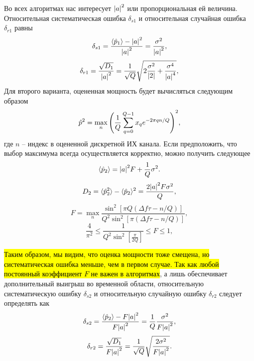 Во всех алгоритмах нас интересует $\abs{a}^2$ или пропорциональная ей величина.
Относительная систематическая ошибка $\delta_{s1}$ и относительная случайная ошибка $\delta_{r1}$ равны
\begin{equation}
    \delta_{s1} = \frac{\langle \hat p_1 \rangle - \abs{a}^2}{\abs{a}^2} = \frac{\sigma^2}{\abs{a}^2},
\end{equation}
\begin{equation}
    \delta_{r1} = \frac{\sqrt{D_1}}{\abs{a}^2} =
    \frac{1}{\sqrt{Q}} \sqrt{2 \frac{\sigma^2}{\abs{2}} +
        \frac{\sigma^4}{\abs{a}^4}},
\end{equation}
Для второго варианта, оцененная мощность будет вычисляться следующим образом
\begin{equation}
    \hat p^2 = \max_n\qty(\frac{1}{Q} \sum\limits_{q=0}^{Q-1} x_q e^{-2 \pi q n /Q})^2,
\end{equation}
где $n$ -- индекс в оцененной дискретной ИХ канала. 
Если предположить, что выбор максимума всегда осуществляется корректно, можно
получить следующее
\begin{equation}
    \langle \hat p_2 \rangle = \abs{a}^2 F + \frac{1}{Q}\sigma^2.
\end{equation}
\begin{equation}
    D_2 = \langle \hat p_2^2 \rangle - \langle \hat p_2 \rangle^2 = \frac{2\abs{a}^2 F \sigma^2}{Q},
\end{equation}
\begin{equation}
    F = \max_n \frac{\sin^2[\pi Q (\Delta f \tau - n/Q)]}{Q^2 \sin^2[\pi(\Delta f \tau - n/Q)]},
\end{equation}
\begin{equation}
    \frac{4}{\pi^2} \leq \frac{1}{Q^2 \sin^2[\frac{\pi}{2Q}]} \leq F \leq 1,
\end{equation}


\hl{
Таким образом, мы видим, что оценка мощности тоже смещена, но систематическая
ошибка меньше, чем в первом случае.
Так как любой постоянный коэффициент $F$ не важен в алгоритмах}, а
лишь обеспечивает дополнительный выигрыш во временной области, относительную
систематическую ошибку $\delta_{s2}$ и относительную случайную ошибку $\delta_{r2}$ следует
определять как
\begin{equation}
    \delta_{s2} = \frac{\langle \hat p_2 \rangle - F \abs{a}^2}{F \abs{a}^2} = \frac{1}{Q} \frac{\sigma^2}{F\abs{a}^2},
\end{equation}
\begin{equation}
    \delta_{r2} = \frac{\sqrt{D_1}}{F\abs{a}^2} = \frac{1}{\sqrt Q} \sqrt{\frac{2\sigma^2}{F\abs{a}^2}}.
\end{equation}

